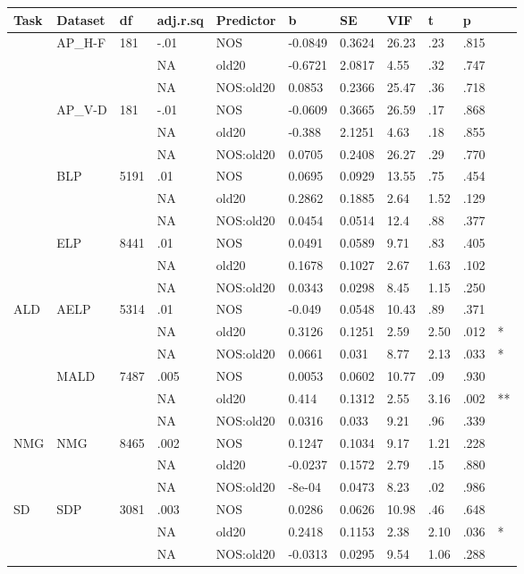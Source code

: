 \begin{table}[ht]
\centering
\begingroup\normalsize
\begin{tabular}{lllllllllll}
  \hline
Task & Dataset & df & adj.r.sq & Predictor & b & SE & VIF & t & p &  \\ 
  \hline
 & AP\_H-F & 181 & -.01 & NOS & -0.0849 & 0.3624 & 26.23 & .23 & .815 &   \\ 
   &  &  & NA & old20 & -0.6721 & 2.0817 & 4.55 & .32 & .747 &   \\ 
   &  &  & NA & NOS:old20 & 0.0853 & 0.2366 & 25.47 & .36 & .718 &   \\ 
   & AP\_V-D & 181 & -.01 & NOS & -0.0609 & 0.3665 & 26.59 & .17 & .868 &   \\ 
   &  &  & NA & old20 & -0.388 & 2.1251 & 4.63 & .18 & .855 &   \\ 
   &  &  & NA & NOS:old20 & 0.0705 & 0.2408 & 26.27 & .29 & .770 &   \\ 
   & BLP & 5191 & .01 & NOS & 0.0695 & 0.0929 & 13.55 & .75 & .454 &   \\ 
   &  &  & NA & old20 & 0.2862 & 0.1885 & 2.64 & 1.52 & .129 &   \\ 
   &  &  & NA & NOS:old20 & 0.0454 & 0.0514 & 12.4 & .88 & .377 &   \\ 
   & ELP & 8441 & .01 & NOS & 0.0491 & 0.0589 & 9.71 & .83 & .405 &   \\ 
   &  &  & NA & old20 & 0.1678 & 0.1027 & 2.67 & 1.63 & .102 &   \\ 
   &  &  & NA & NOS:old20 & 0.0343 & 0.0298 & 8.45 & 1.15 & .250 &   \\ 
  ALD & AELP & 5314 & .01 & NOS & -0.049 & 0.0548 & 10.43 & .89 & .371 &   \\ 
   &  &  & NA & old20 & 0.3126 & 0.1251 & 2.59 & 2.50 & .012 & * \\ 
   &  &  & NA & NOS:old20 & 0.0661 & 0.031 & 8.77 & 2.13 & .033 & * \\ 
   & MALD & 7487 & .005 & NOS & 0.0053 & 0.0602 & 10.77 & .09 & .930 &   \\ 
   &  &  & NA & old20 & 0.414 & 0.1312 & 2.55 & 3.16 & .002 & ** \\ 
   &  &  & NA & NOS:old20 & 0.0316 & 0.033 & 9.21 & .96 & .339 &   \\ 
  NMG & NMG & 8465 & .002 & NOS & 0.1247 & 0.1034 & 9.17 & 1.21 & .228 &   \\ 
   &  &  & NA & old20 & -0.0237 & 0.1572 & 2.79 & .15 & .880 &   \\ 
   &  &  & NA & NOS:old20 & -8e-04 & 0.0473 & 8.23 & .02 & .986 &   \\ 
  SD & SDP & 3081 & .003 & NOS & 0.0286 & 0.0626 & 10.98 & .46 & .648 &   \\ 
   &  &  & NA & old20 & 0.2418 & 0.1153 & 2.38 & 2.10 & .036 & * \\ 
   &  &  & NA & NOS:old20 & -0.0313 & 0.0295 & 9.54 & 1.06 & .288 &   \\ 
   \hline
\end{tabular}
\endgroup
\end{table}
